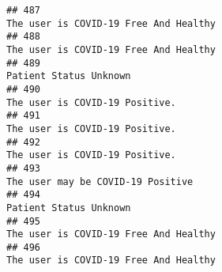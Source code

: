 \documentclass[
]{article}
\begin{document}
\begin{verbatim}
## 487                                                                                                                                                                                                                              The user is COVID-19 Free And Healthy
## 488                                                                                                                                                                                                                              The user is COVID-19 Free And Healthy
## 489                                                                                                                                                                                                                                             Patient Status Unknown
## 490                                                                                                                                                                                                                                     The user is COVID-19 Positive.
## 491                                                                                                                                                                                                                                     The user is COVID-19 Positive.
## 492                                                                                                                                                                                                                                     The user is COVID-19 Positive.
## 493                                                                                                                                                                                                                                  The user may be COVID-19 Positive
## 494                                                                                                                                                                                                                                             Patient Status Unknown
## 495                                                                                                                                                                                                                              The user is COVID-19 Free And Healthy
## 496                                                                                                                                                                                                                              The user is COVID-19 Free And Healthy

\end{verbatim}
\end{document}
